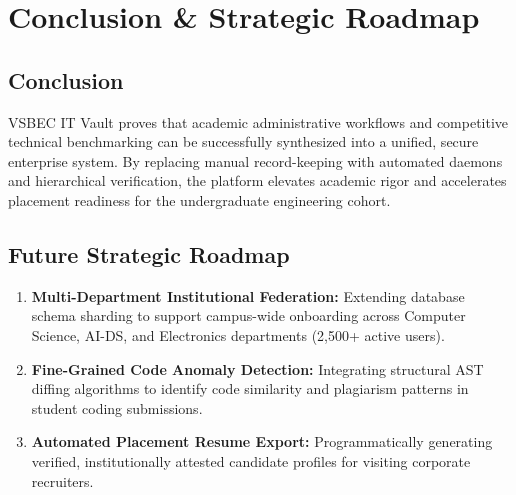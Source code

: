 \documentclass[12pt,a4paper]{report}
\begin{document}
\chapter{Conclusion \& Strategic Roadmap}

\section{Conclusion}
VSBEC IT Vault proves that academic administrative workflows and competitive technical benchmarking can be successfully synthesized into a unified, secure enterprise system. By replacing manual record-keeping with automated daemons and hierarchical verification, the platform elevates academic rigor and accelerates placement readiness for the undergraduate engineering cohort.

\section{Future Strategic Roadmap}
\begin{enumerate}[nosep]
    \item \textbf{Multi-Department Institutional Federation:} Extending database schema sharding to support campus-wide onboarding across Computer Science, AI-DS, and Electronics departments (2,500+ active users).
    \item \textbf{Fine-Grained Code Anomaly Detection:} Integrating structural AST diffing algorithms to identify code similarity and plagiarism patterns in student coding submissions.
    \item \textbf{Automated Placement Resume Export:} Programmatically generating verified, institutionally attested candidate profiles for visiting corporate recruiters.
\end{enumerate}
\end{document}
